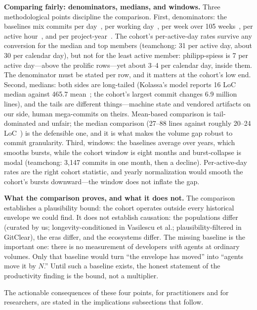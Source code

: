 \textbf{Comparing fairly: denominators, medians, and windows.}
Three methodological points discipline the comparison.
First, denominators: the baselines mix commits per day~\cite{kolassa2013empirical},
per working day~\cite{gitclear2024git}, per week over 105
weeks~\cite{stray2026copilot}, per active hour~\cite{zhang2024workrhythms}, and
per project-year~\cite{milewicz2019characterizing}.
The cohort's per-active-day rates survive any conversion for the median and top
members (teamchong: 31 per active day, about 30 per calendar day), but not for the
least active member: philipp-spiess is 7 per active day---above the prolific
rows---yet about 3--4 per calendar day, inside them.
The denominator must be stated per row, and it matters at the cohort's low end.
Second, medians: both sides are long-tailed (Kolassa's model reports 16 LoC median
against 465.7 mean~\cite{kolassa2013model}; the cohort's largest commit changes
6.9 million lines), and the tails are different things---machine state and
vendored artifacts on our side, human mega-commits on theirs.
Mean-based comparison is tail-dominated and unfair; the median comparison
(27--88 lines against roughly 20--24 LoC~\cite{riehle2012developer,sadowski2018modern})
is the defensible one, and it is what makes the volume gap robust to commit
granularity.
Third, windows: the baselines average over years, which smooths bursts, while the
cohort window is eight months and burst-collapse is modal (teamchong: 3{,}147
commits in one month, then a decline).
Per-active-day rates are the right cohort statistic, and yearly normalization
would smooth the cohort's bursts downward---the window does not inflate the gap.

\textbf{What the comparison proves, and what it does not.}
The comparison establishes a plausibility bound: the cohort operates outside every
historical envelope we could find.
It does not establish causation: the populations differ (curated by us;
longevity-conditioned in Vasilescu et al.; plausibility-filtered in GitClear),
the eras differ, and the ecosystems differ.
The missing baseline is the important one: there is no measurement of developers
\emph{with} agents at ordinary volumes.
Only that baseline would turn ``the envelope has moved'' into ``agents move it by
$N$.''
Until such a baseline exists, the honest statement of the productivity finding is
the bound, not a multiplier.

The actionable consequences of these four points, for practitioners and for
researchers, are stated in the implications subsections that follow.
